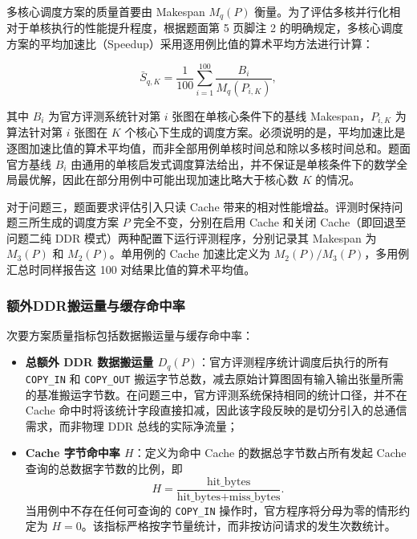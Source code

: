 \documentclass[anonymous,withtoc]{gmcm2026}
\providecommand{\tightlist}{\setlength{\itemsep}{0pt}\setlength{\parskip}{0pt}}
\begin{document}
多核心调度方案的质量首要由 Makespan \(M_q(P)\) 衡量。为了评估多核并行化相对于单核执行的性能提升程度，根据题面第 5 页脚注 2 的明确规定，多核心调度方案的平均加速比（Speedup）采用逐用例比值的算术平均方法进行计算：

\begin{equation}
\bar{S}_{q,K} = \frac{1}{100} \sum_{i=1}^{100} \frac{B_i}{M_q(P_{i,K})},
\end{equation}

其中 \(B_i\) 为官方评测系统针对第 \(i\) 张图在单核心条件下的基线 Makespan，\(P_{i,K}\) 为算法针对第 \(i\) 张图在 \(K\) 个核心下生成的调度方案。必须说明的是，平均加速比是逐图加速比值的算术平均值，而非全部用例单核时间总和除以多核时间总和。题面官方基线 \(B_i\) 由通用的单核启发式调度算法给出，并不保证是单核条件下的数学全局最优解，因此在部分用例中可能出现加速比略大于核心数 \(K\) 的情况。

对于问题三，题面要求评估引入只读 Cache 带来的相对性能增益。评测时保持问题三所生成的调度方案 \(P\) 完全不变，分别在启用 Cache 和关闭 Cache（即回退至问题二纯 DDR 模式）两种配置下运行评测程序，分别记录其 Makespan 为 \(M_3(P)\) 和 \(M_2(P)\)。单用例的 Cache 加速比定义为 \(M_2(P) / M_3(P)\)，多用例汇总时同样报告这 100 对结果比值的算术平均值。

\subsubsection{额外DDR搬运量与缓存命中率}

次要方案质量指标包括数据搬运量与缓存命中率：

\begin{itemize}
\tightlist
\item
  \textbf{总额外 DDR 数据搬运量 \(D_q(P)\)}：官方评测程序统计调度后执行的所有 \texttt{COPY\_IN} 和 \texttt{COPY\_OUT} 搬运字节总数，减去原始计算图固有输入输出张量所需的基准搬运字节数。在问题三中，官方评测系统保持相同的统计口径，并不在 Cache 命中时将该统计字段直接扣减，因此该字段反映的是切分引入的总通信需求，而非物理 DDR 总线的实际净流量；
\item
  \textbf{Cache 字节命中率 \(H\)}：定义为命中 Cache 的数据总字节数占所有发起 Cache 查询的总数据字节数的比例，即 \begin{equation}
H = \frac{\text{hit\_bytes}}{\text{hit\_bytes} + \text{miss\_bytes}}.
\end{equation} 当用例中不存在任何可查询的 \texttt{COPY\_IN} 操作时，官方程序将分母为零的情形约定为 \(H = 0\)。该指标严格按字节量统计，而非按访问请求的发生次数统计。
\end{itemize}
\end{document}
